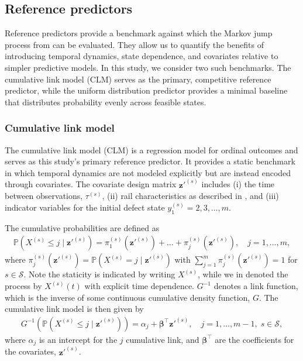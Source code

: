 \subsection{Reference predictors} \label{sec:reference_forecasts}
Reference predictors provide a benchmark against which the Markov jump process from  can be evaluated. They allow us to quantify the benefits of introducing temporal dynamics, state dependence, and covariates relative to simpler predictive models.
In this study, we consider two such benchmarks. The cumulative link model (CLM) serves as the primary, competitive reference predictor, while the uniform distribution predictor provides a minimal baseline that distributes probability evenly across feasible states.

\subsubsection{Cumulative link model} \label{sec:cumulative_link_model}

The cumulative link model (CLM) is a regression model for ordinal outcomes and serves as this study's primary reference predictor. It provides a static benchmark in which temporal dynamics are not modeled explicitly but are instead encoded through covariates. The covariate design matrix $\bm{z}'^{(s)}$ includes (i) the time between observations, $\tau^{(s)}$, (ii) rail characteristics as described in , and (iii) indicator variables for the initial defect state $y_1^{(s)} =2,3,\dots,m$. 

The cumulative probabilities are defined as
\begin{align*}
     \mathds{P}\left( X^{(s)} \leq j \; \vert \; \bm{z}'^{(s)} \right) = 
     \pi_1^{(s)}(\bm{z}'^{(s)}) + \dots + \pi_j^{(s)}(\bm{z}'^{(s)}), \quad j = 1, \dots, m, 
\end{align*}
where $\pi^{(s)}_j\left(\bm{z}'^{(s)}\right) = \mathds{P} \left(  X^{(s)} = j \; \vert \; \bm{z}'^{(s)} \right)$ with $\sum_{j = 1}^m \pi^{(s)}_j(\bm{z}'^{(s)}) = 1$ for $s \in \mathcal{S}$. 
Note the staticity is indicated by writing $X^{(s)}$, while we in  denoted the process by $X^{(s)}(t)$ with explicit time dependence.
$G^{-1}$ denotes a link function, which is the inverse of some continuous cumulative density function, $G$.
The cumulative link model is then given by
\begin{align}
    G^{-1} \left(  \mathds{P}\left( X^{(s)} \leq j \; \vert \; \bm{z}'^{(s)} \right) \right)
    = \alpha_j + \bm{\beta}^\top \bm{z}'^{(s)}, \quad j = 1, \dots, m-1, \; s \in \mathcal{S}, \label{eq:cum_link_model}
\end{align}
where $\alpha_j$ is an intercept for the $j$ cumulative link, and $\bm{\beta}^\top$ are the coefficients for the covariates, $\bm{z}'^{(s)}$. 

